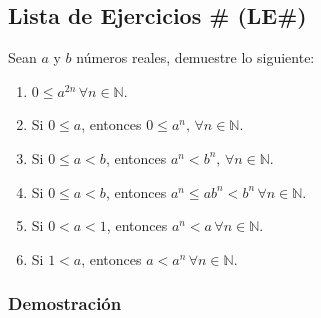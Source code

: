 \documentclass[11pt]{article}
\newcommand{\N}{\mathbb{N}}
\begin{document}
\subsection*{Lista de Ejercicios \# (LE\#)}

Sean $a$ y $b$ números reales, demuestre lo siguiente:

\begin{enumerate}[label=\alph*),font=\bfseries]
    \item $0 \leq a^{2n} \, \forall n\in \N$.
    \item Si $0\leq a$, entonces $ 0 \leq a^n, \, \forall n\in \N$.
    \item Si $0 \leq a <b$, entonces $a^n < b^n, \, \forall n\in \N$.
    \item Si $0 \leq a <b$, entonces $a^n \leq ab^n < b^n \, \forall n\in \N$.
    \item Si $0<a<1$, entonces $a^n<a \, \forall n\in \N$.
    \item Si $1<a$, entonces $a<a^n \, \forall n\in \N$.
\end{enumerate}

\subsubsection*{Demostración}
\end{document}
